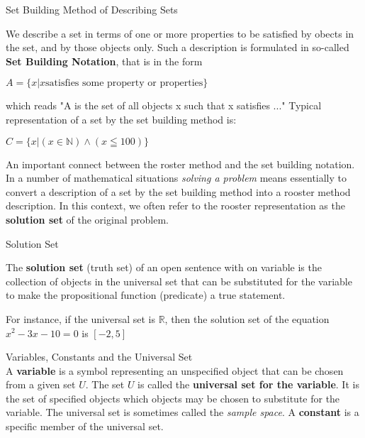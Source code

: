 \begin{definition}
Set Building Method of Describing Sets \\

\begin{tcolorbox}
We describe a set in terms of one or more properties to be satisfied by obects in the set, and by those objects only. Such a description is formulated in so-called {\bf Set Building Notation}, that is in the form 
	\begin{center}
		$A = \{ x | x \text{satisfies some property or properties} \}$
	\end{center}
which reads "A is the set of all objects x such that x satisfies ..." Typical representation of a set by the set building method is:
	\begin{center}
		$C = \{ x | (x \in \mathbb{N})\wedge(x \leqq 100) \}$
	\end{center}	
\end{tcolorbox}

An important connect between the roster method and the set building notation. In a  number of mathematical situations {\it solving a problem} means essentially to convert a description of a set by the set building method into a rooster method description. In this context, we often refer to the rooster representation as the {\bf solution set} of the original problem.  
\end{definition}

\begin{definition}
Solution Set \\

\begin{tcolorbox}
    The {\bf solution set} (truth set) of an open sentence with on variable is the collection of objects in the universal set that can be substituted for the variable to make the propositional function (predicate) a true statement. 
\end{tcolorbox}

For instance, if the universal set is $\mathbb{R}$, then the solution set of the equation $x^2 - 3x - 10 = 0$ is $[-2, 5]$ 
\end{definition}

\begin{definition}
Variables, Constants and the Universal Set \\

A {\bf variable} is a symbol representing an unspecified object that can be chosen from a given set $U$. The set $U$ is called the {\bf universal set for the variable}. It is the set of specified objects which objects may be chosen to substitute for the variable. The universal set is sometimes called the {\it sample space}. A {\bf constant} is a specific member of the universal set. \\
\end{definition}


